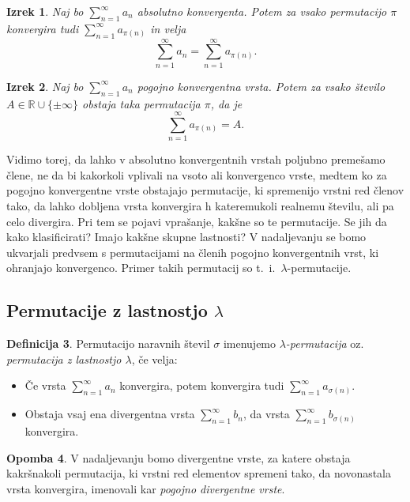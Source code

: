 \documentclass[12pt,a4paper,reqno]{amsart}
\theoremstyle{definition} %
\newtheorem{definicija}{Definicija}[section]
\newtheorem{opomba}[definicija]{Opomba}
\theoremstyle{plain} %
\newtheorem{izrek}[definicija]{Izrek}
\newcommand{\R}{\mathbb R}
\begin{document}
\begin{izrek}\label{izr:absolutno}
Naj bo $\sum^{\infty}_{n=1}a_n$ absolutno konvergenta. Potem za vsako permutacijo $\pi$ konvergira tudi $\sum^{\infty}_{n=1}a_{\pi (n)}$ in velja $$\sum^{\infty}_{n=1}a_n = \sum^{\infty}_{n=1}a_{\pi (n)}.$$
\end{izrek}

\begin{izrek}\label{izr:riemann}
Naj bo $\sum^{\infty}_{n=1}a_n$ pogojno konvergentna vrsta. Potem za vsako število $A\in \R \cup \{ \pm \infty \}$ obstaja taka permutacija $\pi$, da je $$\sum^{\infty}_{n=1}a_{\pi (n)} = A.$$
\end{izrek}

Vidimo torej, da lahko v absolutno konvergentnih vrstah poljubno premešamo člene, ne da bi kakorkoli vplivali na vsoto ali konvergenco vrste, medtem ko za pogojno konvergentne vrste obstajajo permutacije, ki spremenijo vrstni red členov tako, da lahko dobljena vrsta konvergira h kateremukoli realnemu številu, ali pa celo divergira. Pri tem se pojavi vprašanje, kakšne so te permutacije. Se jih da kako klasificirati? Imajo kakšne skupne lastnosti? V nadaljevanju se bomo ukvarjali predvsem s permutacijami na členih pogojno konvergentnih vrst, ki ohranjajo konvergenco. Primer takih permutacij so t.~i.\ $\lambda$-permutacije.

\subsection{Permutacije z lastnostjo $\lambda$}

\begin{definicija}
Permutacijo naravnih števil $\sigma$ imenujemo \emph{$\lambda$-permutacija} oz. \emph{permutacija z lastnostjo $\lambda$}, če velja:
\begin{itemize}
\item[(1)] Če vrsta $\displaystyle\sum^{\infty}_{n=1}a_n$ konvergira, potem konvergira tudi $\displaystyle\sum^{\infty}_{n=1}a_{\sigma (n)}.$
\item[(2)] Obstaja vsaj ena divergentna vrsta $\displaystyle\sum^{\infty}_{n=1}b_n$, da vrsta $\displaystyle\sum^{\infty}_{n=1}b_{\sigma (n)}$ konvergira.
\end{itemize}
\end{definicija}

\begin{opomba}
V nadaljevanju bomo divergentne vrste, za katere obstaja kakršnakoli permutacija, ki vrstni red elementov spremeni tako, da novonastala vrsta konvergira, imenovali kar \emph{pogojno divergentne vrste}.
\end{opomba}
\end{document}

